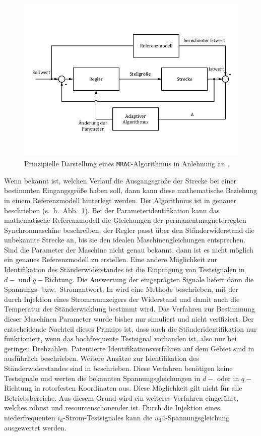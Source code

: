 \documentclass[conference,twocolumn]{IEEEtran}
\newcommand{\x}[1]{\mathrm{#1}}
\begin{document}
\begin{figure}[h!]
\centering
\includegraphics[width=\columnwidth]{img/mrac}
\caption{Prinzipielle Darstellung eines \texttt{MRAC}-Algorithmus in Anlehnung an \textcite{slotine_applied_1991}.}
\label{fig:mrac}
\end{figure}

Wenn bekannt ist, welchen Verlauf die Ausgangsgröße der Strecke bei einer bestimmten Eingangsgröße haben soll, dann kann diese mathematische Beziehung in einem Referenzmodell hinterlegt werden.
Der Algorithmus ist in \autocite{slotine_applied_1991} genauer beschrieben (s.~h.~Abb.~\ref{fig:mrac}).
Bei der Parameteridentifikation kann das mathematische Referenzmodell die Gleichungen der permanentmagneterregten Synchronmaschine beschreiben, der Regler passt über den Ständerwiderstand die unbekannte Strecke an, bis sie den idealen Maschinengleichungen entsprechen.
Sind die Parameter der Maschine nicht genau bekannt, dann ist es nicht möglich ein genaues Referenzmodell zu erstellen.
Eine andere Möglichkeit zur Identifikation des Ständerwiderstandes ist die Einprägung von Testsignalen in $d-$ und $q-$Richtung.
Die Auswertung der eingeprägten Signale liefert dann die Spannungs- bzw.\ Stromantwort.
In \autocite{wilson2005} wird eine Methode beschrieben, mit der durch Injektion eines Stromraumzeigers der Widerstand und damit auch die Temperatur der Ständerwicklung bestimmt wird.
Das Verfahren zur Bestimmung dieser Maschinen Parameter wurde bisher nur simuliert und nicht verifiziert.
Der entscheidende Nachteil dieses Prinzips ist, dass auch die Ständeridentifikation nur funktioniert, wenn das hochfrequente Testsignal vorhanden ist, also nur bei geringen Drehzahlen.
Patentierte Identifikationsverfahren auf dem Gebiet sind in \autocites{schutzrecht1}{schutzrecht2} ausführlich beschrieben.
Weitere Ansätze zur Identifikation des Ständerwiderstandes sind in \textcite{Kellner2012} beschrieben.
Diese Verfahren benötigen keine Testsignale und werten die bekannten Spannungsgleichungen in $d-$ oder in $q-$Richtung in rotorfesten Koordinaten aus.
Diese Möglichkeit gilt nicht für alle Betriebsbereiche. 
Aus diesem Grund wird ein weiteres Verfahren eingeführt, welches robust und resourcenschonender ist.
Durch die Injektion eines niederfrequenten $i_\x{d}$-Strom-Testsignales kann die $u_\x{d}4$-Spannungsgleichung ausgewertet werden.
\end{document}
